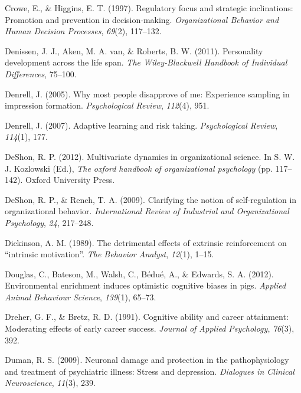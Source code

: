 \documentclass[english,,man]{apa6}
\theoremstyle{definition}
\theoremstyle{definition}
\theoremstyle{definition}
\theoremstyle{remark}
\begin{document}
\leavevmode\hypertarget{ref-crowe1997}{}%
Crowe, E., \& Higgins, E. T. (1997). Regulatory focus and strategic
inclinations: Promotion and prevention in decision-making.
\emph{Organizational Behavior and Human Decision Processes},
\emph{69}(2), 117--132.

\leavevmode\hypertarget{ref-denissen2011}{}%
Denissen, J. J., Aken, M. A. van, \& Roberts, B. W. (2011). Personality
development across the life span. \emph{The Wiley-Blackwell Handbook of
Individual Differences}, 75--100.

\leavevmode\hypertarget{ref-denrell2005}{}%
Denrell, J. (2005). Why most people disapprove of me: Experience
sampling in impression formation. \emph{Psychological Review},
\emph{112}(4), 951.

\leavevmode\hypertarget{ref-denrell2007adaptive}{}%
Denrell, J. (2007). Adaptive learning and risk taking.
\emph{Psychological Review}, \emph{114}(1), 177.

\leavevmode\hypertarget{ref-DeShon2012}{}%
DeShon, R. P. (2012). Multivariate dynamics in organizational science.
In S. W. J. Kozlowski (Ed.), \emph{The oxford handbook of organizational
psychology} (pp. 117--142). Oxford University Press.

\leavevmode\hypertarget{ref-deshon2009}{}%
DeShon, R. P., \& Rench, T. A. (2009). Clarifying the notion of
self-regulation in organizational behavior. \emph{International Review
of Industrial and Organizational Psychology}, \emph{24}, 217--248.

\leavevmode\hypertarget{ref-dickinson1989}{}%
Dickinson, A. M. (1989). The detrimental effects of extrinsic
reinforcement on ``intrinsic motivation''. \emph{The Behavior Analyst},
\emph{12}(1), 1--15.

\leavevmode\hypertarget{ref-douglas2012}{}%
Douglas, C., Bateson, M., Walsh, C., Bédué, A., \& Edwards, S. A.
(2012). Environmental enrichment induces optimistic cognitive biases in
pigs. \emph{Applied Animal Behaviour Science}, \emph{139}(1), 65--73.

\leavevmode\hypertarget{ref-dreher1991}{}%
Dreher, G. F., \& Bretz, R. D. (1991). Cognitive ability and career
attainment: Moderating effects of early career success. \emph{Journal of
Applied Psychology}, \emph{76}(3), 392.

\leavevmode\hypertarget{ref-duman2009}{}%
Duman, R. S. (2009). Neuronal damage and protection in the
pathophysiology and treatment of psychiatric illness: Stress and
depression. \emph{Dialogues in Clinical Neuroscience}, \emph{11}(3),
239.
\end{document}
